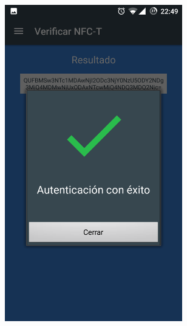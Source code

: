 \documentclass[../PFC.tex]{subfiles}
\begin{document}
\begin{figure}[H]
\centering
	\begin{subfigure}{0.4\textwidth}
		\centering
		\includegraphics[width=0.85\textwidth]{./img/app/ValidacionExitoNoEscrito}
    \end{subfigure}          
    \qquad\qquad\qquad  %
    \begin{subfigure}{0.4\textwidth}  
       \centering

\end{subfigure}
\end{figure}
\end{document}

